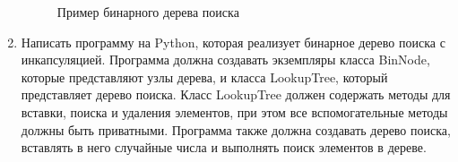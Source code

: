 \begin{enumerate}
\begin{figure}[h]
\centering
{}
\caption{Пример бинарного дерева поиска}
\end{figure}

\item Написать программу на Python, которая реализует бинарное дерево поиска с инкапсуляцией. Программа должна создавать экземпляры класса BinNode, которые представляют узлы дерева, и класса LookupTree, который представляет дерево поиска. Класс LookupTree должен содержать методы для вставки, поиска и удаления элементов, при этом все вспомогательные методы должны быть приватными. Программа также должна создавать дерево поиска, вставлять в него случайные числа и выполнять поиск элементов в дереве.


\end{enumerate}
